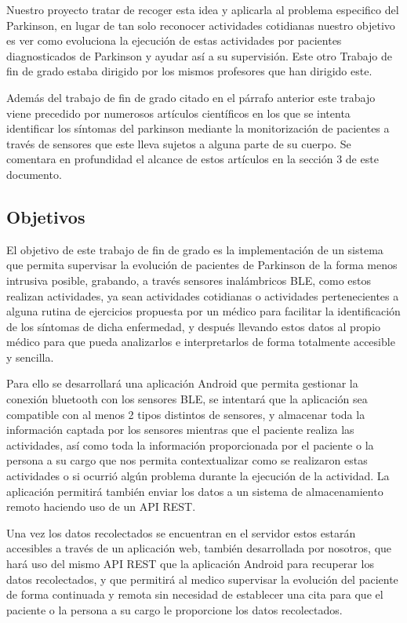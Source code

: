 \documentclass[11pt,spanish]{article}
\begin{document}
Nuestro proyecto tratar de recoger esta idea y aplicarla al problema especifico del Parkinson, en lugar de tan solo reconocer actividades cotidianas nuestro objetivo es ver como evoluciona la ejecución de estas actividades por pacientes diagnosticados de Parkinson y ayudar así a su supervisión. Este otro Trabajo de fin de grado estaba dirigido por los mismos profesores que han dirigido este.
\newline

Además del trabajo de fin de grado citado en el párrafo anterior este trabajo viene precedido por numerosos artículos científicos en los que se intenta identificar los síntomas del parkinson mediante la monitorización de pacientes a través de sensores que este lleva sujetos a alguna parte de su cuerpo. Se comentara en profundidad el alcance de estos artículos en la sección 3 de este documento.

\subsection{Objetivos}

El objetivo de este trabajo de fin de grado es la implementación de un sistema que permita supervisar la evolución de pacientes de Parkinson de la forma menos intrusiva posible, grabando, a través sensores inalámbricos BLE, como estos realizan actividades, ya sean actividades cotidianas o actividades pertenecientes a alguna rutina de ejercicios propuesta por un médico para facilitar la identificación de los síntomas de dicha enfermedad, y después llevando estos datos al propio médico para que pueda analizarlos e interpretarlos de forma totalmente accesible y sencilla. 
\newline

Para ello se desarrollará una aplicación Android que permita gestionar la conexión bluetooth con los sensores BLE, se intentará que la aplicación sea compatible con al menos 2 tipos distintos de sensores, y almacenar toda la información captada por los sensores mientras que el paciente realiza las actividades, así como toda la información proporcionada por el paciente o la persona a su cargo que nos permita contextualizar como se realizaron estas actividades o si ocurrió algún problema durante la ejecución de la actividad. La aplicación permitirá también enviar los datos a un sistema de almacenamiento remoto haciendo uso de un API REST. 
\newline

Una vez los datos recolectados se encuentran en el servidor estos estarán accesibles a través de un aplicación web, también desarrollada por nosotros, que hará uso del mismo API REST que la aplicación Android para recuperar los datos recolectados, y que permitirá al medico supervisar la evolución del paciente de forma continuada y remota sin necesidad de establecer una cita para que el paciente o la persona a su cargo le proporcione los datos recolectados. 
\newline
\end{document}
